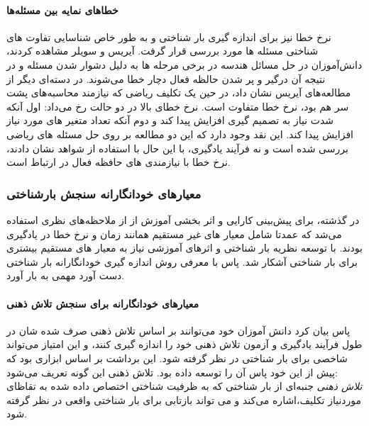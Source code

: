 \paragraph{خطاهای نمایه بین مسئله‌ها}
نرخ خطا نیز برای اندازه گیری بار شناختی و به طور خاص شناسایی تفاوت های شناختی مسئله ها مورد بررسی قرار گرفت.
آیریس و سویلر مشاهده کردند، دانش‌آموزان در حل مسائل هندسه در برخی مرحله ها به دلیل دشوار شدن مسئله و در نتیجه آن درگیر و پر شدن حالظه فعال دچار خطا می‌شوند.
\cite{ayres1990locus}
در دسته‌ای دیگر از مطالعه‌های آیریس نشان داد، در حین یک تکلیف ریاضی که نیازمند محاسبه‌های پشت سر هم بود، نرخ خطا متفاوت است. نرخ خطای بالا در دو حالت رخ می‌داد: اول آنکه شدت نیاز به تصمیم گیری افزایش پیدا کند و دوم آنکه تعداد متغیر های مورد نیاز افزایش پیدا کند.
\cite{ayres2001systematic}
این نقد وجود دارد که این دو مطالعه بر روی حل مسئله های ریاضی بررسی شده است و نه فرآیند یادگیری، با این حال با استفاده از شواهد نشان دادند، نرخ خطا با نیازمندی های حافظه فعال در ارتباط است.
\subsubsection{معیارهای خودانگارانه سنجش بارشناختی}
در گذشته،‌ برای پیش‌بینی کارایی و اثر بخشی آموزش از از ملاحظه‌های نظری استفاده می‌شد که عمدتا شامل معیار های غیر مستقیم همانند زمان و نرخ خطا در یادگیری بودند. با توسعه نظریه بار شناختی و اثر‌های آموزشی نیاز به معیار های مستقیم بیشتری برای بار شناختی آشکار شد. پاس با معرفی روش اندازه گیری خودانگارانه بار شناختی دست آورد مهمی به بار آورد.
\paragraph{معیارهای خودانگارانه برای سنجش تلاش ذهنی}
پاس بیان کرد دانش آموزان خود می‌توانند بر اساس تلاش ذهنی صرف شده شان در طول فرآیند یادگیری و آزمون تلاش ذهنی خود را اندازه گیری کنند، و این امتیاز می‌تواند شاخصی برای بار شناختی در نظر گرفته شود. این برداشت بر اساس ابزاری بود که پیش از این خود پاس آن را توسعه داده بود.
\cite{paas1992training}
تلاش ذهنی این گونه تعریف می‌شود:
\\
\textit{تلاش ذهنی }
جنبه‌ای از بار شناختی که به ظرفیت شناختی اختصاص داده شده به تقاظای موردنیاز تکلیف،‌اشاره می‌کند و می تواند بازتابی برای بار شناختی واقعی در نظر گرفته شود.

